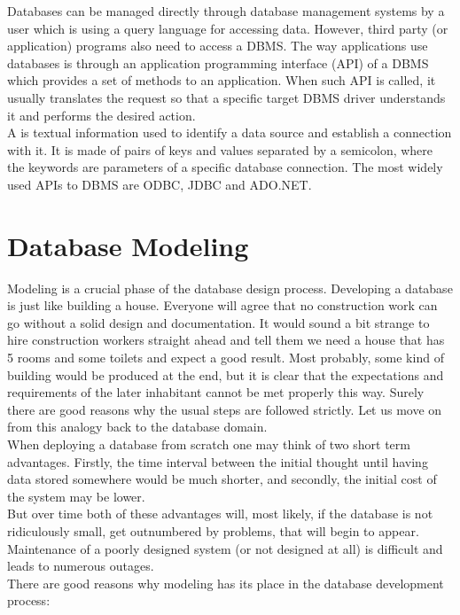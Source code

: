 Databases can be managed directly through database management systems by a user which is using a query language for accessing data. 
However, third party (or application) programs also need to access a DBMS. 
The way applications use databases is through an application programming interface (API) of a DBMS which provides a set of methods to an application.
When such API is called, it usually translates the request so that a specific target DBMS driver understands it and performs the desired action. \\

A  is textual information used to identify a data source and establish a connection with it. It is made of pairs of keys and values separated by a semicolon, where the keywords are parameters of a specific database connection. The most widely used APIs to DBMS are ODBC, JDBC and ADO.NET.

\section{Database Modeling}
\label{chap:database_modeling}

Modeling is a crucial phase of the database design process.
Developing a database is just like building a house. 
Everyone will agree that no construction work can go without a solid design and documentation. 
It would sound a bit strange to hire construction workers straight ahead and tell them we need a house that has 5 rooms and some toilets and expect a good result. Most probably, some kind of building would be produced at the end, but it is clear that the expectations and requirements of the later inhabitant cannot be met properly this way.
Surely there are good reasons why the usual steps are followed strictly.
Let us move on from this analogy back to the database domain. \\
When deploying a database from scratch one may think of two short term advantages. Firstly,  the time interval between the initial thought until having data stored somewhere would be much shorter, and secondly, the initial cost of the system may be lower. \\
But over time both of these advantages will, most likely, if the database is not ridiculously small, get outnumbered by problems, that will begin to appear. Maintenance of a poorly designed system (or not designed at all) is difficult and leads to numerous outages.\\

There are good reasons why modeling has its place in the database development process:

